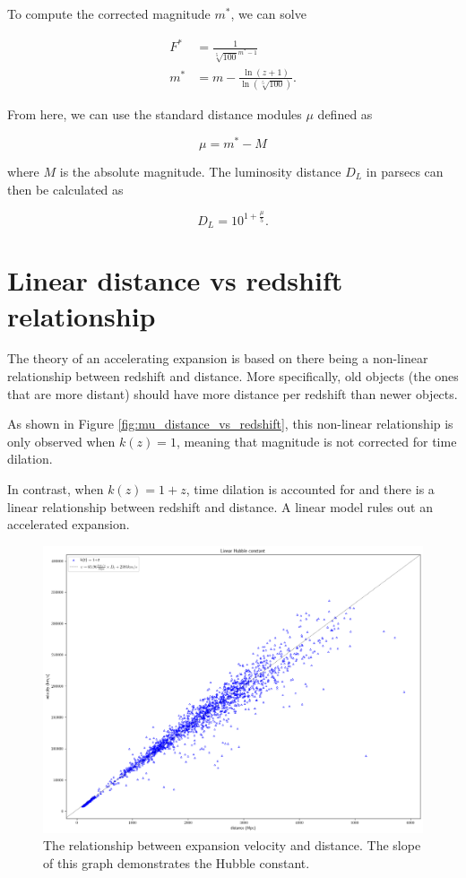 \documentclass{article}
\begin{document}
To compute the corrected magnitude $m^*$, we can solve

\begin{equation}
\begin{aligned}
   F^* &= \frac{1}{\sqrt[5]{100}^{m^* - 1}} \\
   m^* &= m - \frac{\ln{(z + 1)}}{\ln{(\sqrt[5]{100})}}.
\end{aligned}
\end{equation}

From here, we can use the standard distance modules $\mu$ defined as

\begin{equation}
  \mu = m^* - M
\end{equation}

where $M$ is the absolute magnitude. The luminosity distance $D_L$ in parsecs
can then be calculated as

\begin{equation}
  D_L = 10^{1 + \frac{\mu}{5}}.
\end{equation}

\section{Linear distance vs redshift relationship}
\label{hubblelaw}

The theory of an accelerating expansion is based on there being a non-linear
relationship between redshift and distance. More specifically, old objects (the
ones that are more distant) should have more distance per redshift than newer
objects.

As shown in Figure \ref{fig:mu_distance_vs_redshift}, this non-linear
relationship is only observed when $k(z) = 1$, meaning that magnitude is not
corrected for time dilation.

In contrast, when $k(z) = 1 + z$, time dilation is accounted for and there is a
linear relationship between redshift and distance. A linear model rules out an
accelerated expansion.

\begin{figure}[ht]
  \includegraphics[width=\linewidth]{velocity_vs_distance.png}
  \caption{The relationship between expansion velocity and distance. The slope of this graph demonstrates the Hubble constant.
  }
\end{figure}
\end{document}
